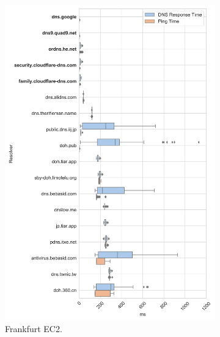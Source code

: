 \begin{figure}[t!]
\begin{subfigure}[b]{0.4\textwidth}
\includegraphics[width=\textwidth]{figures/frankfurt_asia.png}
    \caption{Frankfurt EC2.}
\label{fig:subfigb}
\end{subfigure}
%
\begin{subfigure}[b]{0.4\textwidth}

\end{subfigure}
\end{figure}
